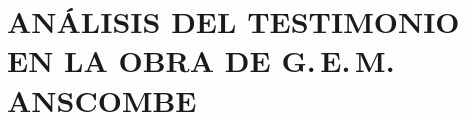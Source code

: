 \documentclass[./main.tex]{subfiles}
\begin{document}
\setcounter{chapter}{2}

\chapter{ANÁLISIS DEL TESTIMONIO EN LA OBRA DE G.\,E.\,M. ANSCOMBE}



%
\end{document}
